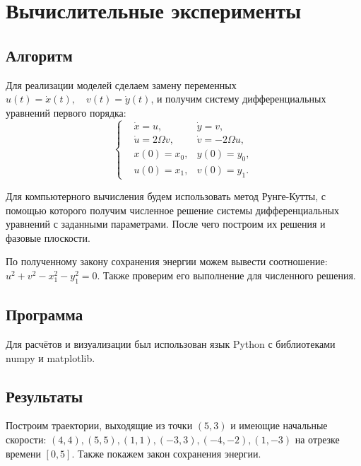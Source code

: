 \section{Вычислительные эксперименты}

    \subsection{Алгоритм}
        Для реализации моделей сделаем замену переменных \( u(t) = \dot{x}(t), \quad v(t) = \dot{y}(t) \), и получим систему дифференциальных уравнений первого порядка:
        \[
            \left\{\begin{split}
                & \dot{x} = u, & \dot{y} = v, \\
                & \dot{u} = 2 \Omega v, & \dot{v} = -2 \Omega u, \\
                & x(0) = x_0, & y(0) = y_0, \\
                & u(0) = x_1, & v(0) = y_1.
            \end{split}\right.
        \]

        Для компьютерного вычисления будем использовать метод Рунге-Кутты, с помощью которого получим численное решение системы дифференциальных уравнений с заданными параметрами. После чего построим их решения и фазовые плоскости.

        По полученному закону сохранения энергии можем вывести соотношение: \( u^2 + v^2 - x_1^2 - y_1^2 = 0 \). Также проверим его выполнение для численного решения.



    \subsection{Программа}
        Для расчётов и визуализации был использован язык Python с библиотеками numpy и matplotlib.

    \subsection{Результаты}
        Построим траектории, выходящие из точки \( (5, 3) \) и имеющие начальные скорости: \( (4, 4), (5, 5), (1, 1), (-3, 3), (-4, -2), (1, -3) \) на отрезке времени \( [0, 5] \). Также покажем закон сохранения энергии.

